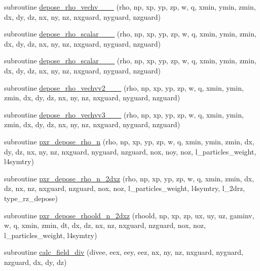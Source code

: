 \begin{DoxyCompactItemize}
\item 
subroutine \hyperlink{namespacediagnostics_aa80c907f0f5c0becf0810c995f00a21a}{depose\+\_\+rho\+\_\+vechv\+\_\+\_\+\_} (rho, np, xp, yp, zp, w, q, xmin, ymin, zmin, dx, dy, dz, nx, ny, nz, nxguard, nyguard, nzguard)
\item 
subroutine \hyperlink{namespacediagnostics_aeb5c0a99b3e4cc7708ecaeb6326f21f6}{depose\+\_\+rho\+\_\+scalar\+\_\+\_\+\_} (rho, np, xp, yp, zp, w, q, xmin, ymin, zmin, dx, dy, dz, nx, ny, nz, nxguard, nyguard, nzguard)
\item 
subroutine \hyperlink{namespacediagnostics_a0767b1e1eb3f73ff84acdb523f574e25}{depose\+\_\+rho\+\_\+scalar\+\_\+\_\+\_} (rho, np, xp, yp, zp, w, q, xmin, ymin, zmin, dx, dy, dz, nx, ny, nz, nxguard, nyguard, nzguard)
\item 
subroutine \hyperlink{namespacediagnostics_a5b450ee961087e014783a7c06fe8df25}{depose\+\_\+rho\+\_\+vechvv2\+\_\+\_\+\_} (rho, np, xp, yp, zp, w, q, xmin, ymin, zmin, dx, dy, dz, nx, ny, nz, nxguard, nyguard, nzguard)
\item 
subroutine \hyperlink{namespacediagnostics_a7087b6f9a6ee62563b51f77e799377f6}{depose\+\_\+rho\+\_\+vechvv3\+\_\+\_\+\_} (rho, np, xp, yp, zp, w, q, xmin, ymin, zmin, dx, dy, dz, nx, ny, nz, nxguard, nyguard, nzguard)
\item 
subroutine \hyperlink{namespacediagnostics_a7d64ffee6339ffb7ca37adfe101c444d}{pxr\+\_\+depose\+\_\+rho\+\_\+n} (rho, np, xp, yp, zp, w, q, xmin, ymin, zmin, dx, dy, dz, nx, ny, nz,                                                                                       nxguard, nyguard, nzguard, nox, noy, noz,                                                                                           l\+\_\+particles\+\_\+weight, l4symtry)
\item 
subroutine \hyperlink{namespacediagnostics_a480ed63b3c5511d2cae7bbe81dd07334}{pxr\+\_\+depose\+\_\+rho\+\_\+n\+\_\+2dxz} (rho, np, xp, yp, zp, w, q, xmin, zmin, dx, dz, nx, nz, nxguard, nzguard, nox, noz, l\+\_\+particles\+\_\+weight, l4symtry, l\+\_\+2drz, type\+\_\+rz\+\_\+depose)
\item 
subroutine \hyperlink{namespacediagnostics_ad46a700a868c3f7e10a2579130729a65}{pxr\+\_\+depose\+\_\+rhoold\+\_\+n\+\_\+2dxz} (rhoold, np, xp, zp, ux, uy, uz, gaminv, w, q, xmin, zmin, dt, dx, dz, nx, nz, nxguard, nzguard, nox, noz, l\+\_\+particles\+\_\+weight, l4symtry)
\item 
subroutine \hyperlink{namespacediagnostics_a28ade3a7daafd373b08dd7742315ed98}{calc\+\_\+field\+\_\+div} (divee, eex, eey, eez, nx, ny, nz, nxguard, nyguard, nzguard, dx, dy, dz)

\end{DoxyCompactItemize}
